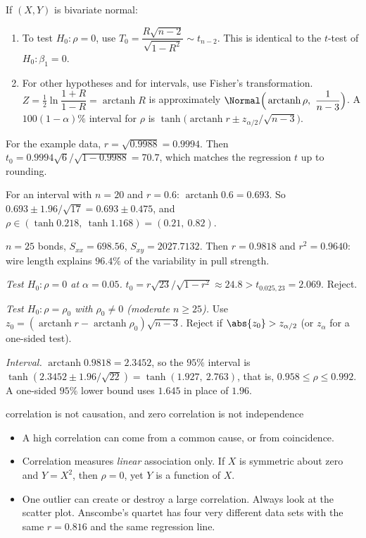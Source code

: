 \begin{theorem}\label{thm:corr}
If $(X,Y)$ is bivariate normal:
\begin{enumerate}[label=(\roman*)]
  \item To test $H_0:\rho=0$, use $T_0=\dfrac{R\sqrt{n-2}}{\sqrt{1-R^2}}\sim t_{n-2}$. This is identical to the $t$-test of $H_0:\beta_1=0$.
  \item For other hypotheses and for intervals, use Fisher's transformation. $Z=\tfrac12\ln\dfrac{1+R}{1-R}=\operatorname{arctanh}R$ is approximately $\Normal\Big(\operatorname{arctanh}\rho,\ \dfrac1{n-3}\Big)$. A $100(1-\alpha)\%$ interval for $\rho$ is $\tanh\big(\operatorname{arctanh}r\pm z_{\alpha/2}/\sqrt{n-3}\big)$.
\end{enumerate}
\end{theorem}

\begin{example}
For the example data, $r=\sqrt{0.9988}=0.9994$. Then $t_0=0.9994\sqrt6/\sqrt{1-0.9988}=70.7$, which matches the regression $t$ up to rounding.

For an interval with $n=20$ and $r=0.6$: $\operatorname{arctanh}0.6=0.693$. So $0.693\pm1.96/\sqrt{17}=0.693\pm0.475$, and $\rho\in(\tanh0.218,\ \tanh1.168)=(0.21,\ 0.82)$.
\end{example}

\begin{example}
$n=25$ bonds, $S_{xx}=698.56$, $S_{xy}=2027.7132$. Then $r=0.9818$ and $r^2=0.9640$: wire length explains $96.4\%$ of the variability in pull strength.

\emph{Test $H_0:\rho=0$ at $\alpha=0.05$.} $t_0=r\sqrt{23}/\sqrt{1-r^2}\approx24.8>t_{0.025,23}=2.069$. Reject.

\emph{Test $H_0:\rho=\rho_0$ with $\rho_0\ne0$ (moderate $n\ge25$).} Use $z_0=(\operatorname{arctanh}r-\operatorname{arctanh}\rho_0)\sqrt{n-3}$. Reject if $\abs{z_0}>z_{\alpha/2}$ (or $z_\alpha$ for a one-sided test).

\emph{Interval.} $\operatorname{arctanh}0.9818=2.3452$, so the $95\%$ interval is $\tanh(2.3452\pm1.96/\sqrt{22})=\tanh(1.927,\ 2.763)$, that is, $0.958\le\rho\le0.992$. A one-sided $95\%$ lower bound uses $1.645$ in place of $1.96$.
\end{example}

\begin{pitfall}{correlation is not causation, and zero correlation is not independence}
\begin{itemize}
  \item A high correlation can come from a common cause, or from coincidence.
  \item Correlation measures \emph{linear} association only. If $X$ is symmetric about zero and $Y=X^2$, then $\rho=0$, yet $Y$ is a function of $X$.
  \item One outlier can create or destroy a large correlation. Always look at the scatter plot. Anscombe's quartet has four very different data sets with the same $r=0.816$ and the same regression line.
\end{itemize}
\end{pitfall}

